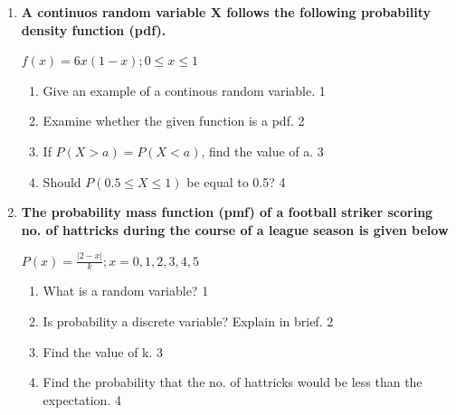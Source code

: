 \documentclass[a4paper,oneside, margin=1.4in]{book}
\begin{document}
\begin{enumerate}
  \begin{enumerate}
    \item
	What is a probability mass function? \hfill 1
    \item
	Can we dtermine the probability of a certain value of a discrete random variable? \hfill 2
    \item  
	What is the value of w? \hfill 3
    \item
	Which table is a proper probability distribution? Justify with mathematical reasoning. \hfill 4
  \end{enumerate}
  
   \item
	  \textbf{A continuos random variable X follows the following probability density function (pdf).} 
	  \begin{center}
	  $f(x) = 6x(1-x); 0\le x\le 1$
  \end{center}
  
  \begin{enumerate}
    \item
	Give an example of a continous random variable. \hfill 1
    \item
	Examine whether the given function is a pdf. \hfill 2
    \item  
	If $P(X>a) = P(X<a)$, find the value of a. \hfill 3
    \item
	Should $P(0.5 \le X \le 1)$  be equal to 0.5? \hfill 4
  \end{enumerate}
  
     \item
	  \textbf{The probability mass function (pmf) of a football striker scoring no. of hattricks during the course of a league season is given below}
	  
	  \begin{center}
	  $\displaystyle P(x)  = \frac{|2-x|}{k}; x = 0, 1, 2, 3, 4, 5$
	  \end{center}
  
  \begin{enumerate}
    \item
    What is a random variable? \hfill 1
    \item
		Is probability a discrete variable? Explain in brief. \hfill 2
    \item  
	Find the value of k.  \hfill 3
    \item
	Find the probability that the no. of hattricks would be less than the expectation. \hfill 4
  \end{enumerate}
  


\end{enumerate}
\end{document}
